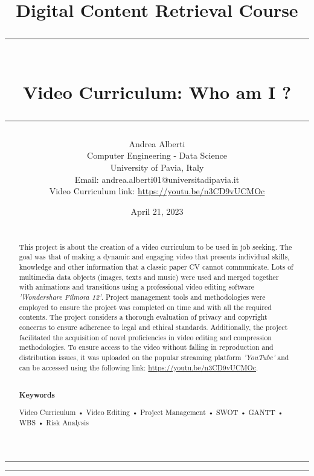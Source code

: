 \documentclass{article}
\title{\Large Digital Content Retrieval Course\vspace{0.3cm}\\
    \rule{\textwidth}{0.6pt}\vspace{0.3cm}\\
    \textbf{Video Curriculum: Who am I ?}\vspace{0.1cm}\\
    \rule{\textwidth}{0.6pt}\vspace{0.2cm}}
\author{Andrea Alberti\vspace{0.2cm}\\
    \small Computer Engineering - Data Science\\
    \small University of Pavia, Italy \\
    \small Email: andrea.alberti01@universitadipavia.it\vspace{0.2cm}\\
    \small Video Curriculum link: \url{https://youtu.be/n3CD9vUCMOc}}
\date{ April 21, 2023}
\begin{document}
\begin{titlepage}
    
    \maketitle %
    \thispagestyle{empty} %
    \begin{multicols*}{2}
        \hrule
        \tableofcontents %
        \vspace{3cm}
        \newcolumn
        \hrule
        \begin{abstract}
            \noindent
            \\
            This project is about the creation of a video curriculum to be used in job seeking. The goal was that of making a dynamic and engaging video that presents individual skills, knowledge and
            other information that a classic paper CV cannot communicate. Lots of multimedia data objects (images, texts and music) were used and merged together with animations and transitions using
            a professional video editing software \textit{'Wondershare Filmora 12'}.
            Project management tools and methodologies were employed to ensure the project was completed on time and with all the required contents. The project considers a thorough evaluation of privacy and copyright concerns to ensure adherence to legal and ethical standards. 
            Additionally, the project facilitated the acquisition of novel proficiencies in video editing and compression methodologies. To ensure access to the video without falling in reproduction
            and distribution issues, it was uploaded on the popular streaming platform \textit{'YouTube'} and can be accessed using the following link: \url{https://youtu.be/n3CD9vUCMOc}.\\
            \\
            \begin{center} \textbf{Keywords}\\\end{center}Video Curriculum • Video Editing • Project Management • SWOT • GANTT • WBS • Risk Analysis

        \end{abstract}

    \end{multicols*}
  
\end{titlepage}


\newpage
\end{document}
